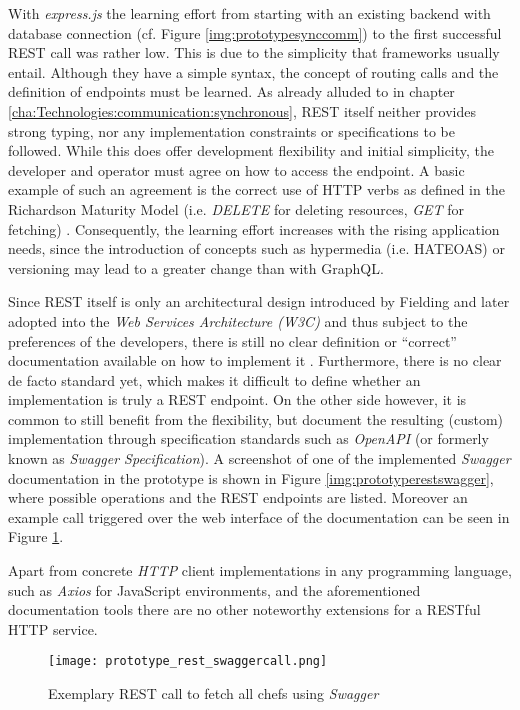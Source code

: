 With \textit{express.js} the learning effort from starting with an existing backend with database connection (cf. Figure \ref{img:prototypesynccomm}) to the first successful REST call was rather low.
This is due to the simplicity that frameworks usually entail.
Although they have a simple syntax, the concept of routing calls and the definition of endpoints must be learned.
As already alluded to in chapter \ref{cha:Technologies:communication:synchronous}, REST itself neither provides strong typing, nor any implementation constraints or specifications to be followed.
While this does offer development flexibility and initial simplicity, the developer and operator must agree on how to access the endpoint.
A basic example of such an agreement is the correct use of \ac{HTTP} verbs as defined in the Richardson Maturity Model (i.e. \textit{DELETE} for deleting resources, \textit{GET} for fetching) \cite{Fowler.2010}.
Consequently, the learning effort increases with the rising application needs, since the introduction of concepts such as hypermedia (i.e. HATEOAS) or versioning may lead to a greater change than with GraphQL.

Since REST itself is only an architectural design introduced by Fielding and later adopted into the \textit{Web Services Architecture (W3C)} and thus subject to the preferences of the developers, there is still no clear definition or \enquote{correct} documentation available on how to implement it \cite{Fielding.15.03.2002}\cite{W3CWorkingGroup.2004}.
Furthermore, there is no clear de facto standard yet, which makes it difficult to define whether an implementation is truly a REST endpoint.
On the other side however, it is common to still benefit from the flexibility, but document the resulting (custom) implementation through specification standards such as \textit{OpenAPI} (or formerly known as \textit{Swagger Specification}).
A screenshot of one of the implemented \textit{Swagger} documentation in the prototype is shown in Figure \ref{img:prototyperestswagger}, where possible operations and the REST endpoints are listed.
Moreover an example call triggered over the web interface of the documentation can be seen in Figure \ref{img:prototyperestcall}.

Apart from concrete \textit{HTTP} client implementations in any programming language, such as \textit{Axios} for JavaScript environments, and the aforementioned documentation tools  there are no other noteworthy extensions for a RESTful \ac{HTTP} service.

\begin{figure}
	\centering
	\texttt{[image: prototype\_rest\_swaggercall.png]}
	\caption{Exemplary REST call to fetch all chefs using \textit{Swagger}}
	\label{img:prototyperestcall}
\end{figure}


